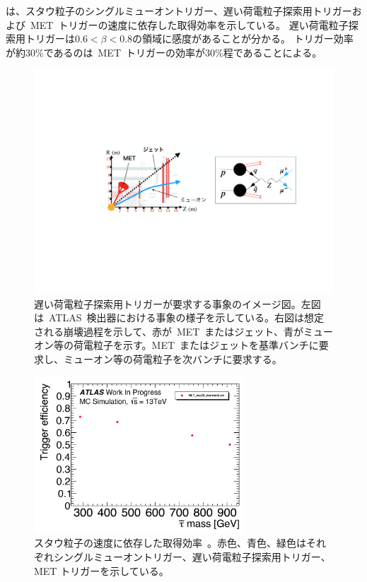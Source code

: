 は、スタウ粒子のシングルミューオントリガー、遅い荷電粒子探索用トリガーおよび~MET~トリガーの速度に依存した取得効率を示している。
遅い荷電粒子探索用トリガーは$0.6 < \beta < 0.8$の領域に感度があることが分かる。
トリガー効率が約$30\%$であるのは~MET~トリガーの効率が$30\%$程であることによる。

\begin{figure}[H]
        \centering   
        \includegraphics[width=\textwidth,page=1]{img/pdf3/met.pdf}
        \caption[遅い荷電粒子探索用トリガーが要求する事象のイメージ図]{遅い荷電粒子探索用トリガーが要求する事象のイメージ図。左図は~ATLAS~検出器における事象の様子を示している。右図は想定される崩壊過程を示して、赤が~MET~またはジェット、青がミューオン等の荷電粒子を示す。MET~またはジェットを基準バンチに要求し、ミューオン等の荷電粒子を次バンチに要求する。}
        \label{fig:met}
\end{figure}

\begin{figure}[H]
        \centering   
        \includegraphics[width=0.7\textwidth,page=3]{img/pdf3/sumi.pdf}
        \caption[スタウ粒子の速度に依存した取得効率]{スタウ粒子の速度に依存した取得効率~\cite{MT:01}。赤色、青色、緑色はそれぞれシングルミューオントリガー、遅い荷電粒子探索用トリガー、MET トリガーを示している。}
        \label{fig:sumi3}
\end{figure}

